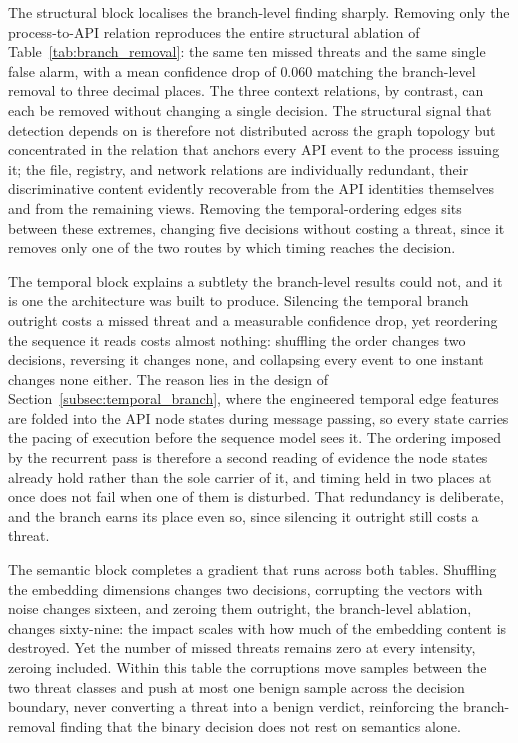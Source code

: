 \documentclass[%
    BCOR=10mm,
    DIV=13,
    toc=bibliography,
    toc=listof,
    oneside,
    12pt,
]{scrbook}
\begin{document}
The structural block localises the branch-level finding sharply. Removing
only the process-to-API relation reproduces the entire structural ablation of
Table~\ref{tab:branch_removal}: the same ten missed threats and the same
single false alarm, with a mean confidence drop of $0.060$ matching the
branch-level removal to three decimal places. The
three context relations, by contrast, can each be removed without changing a
single decision. The structural signal that detection depends on is therefore
not distributed across the graph topology but concentrated in the relation
that anchors every API event to the process issuing it; the file, registry,
and network relations are individually redundant, their discriminative
content evidently recoverable from the API identities themselves and from the
remaining views. Removing the temporal-ordering edges sits between these
extremes, changing five decisions without costing a threat, since it removes
only one of the two routes by which timing reaches the decision.

The temporal block explains a subtlety the branch-level results could not, and
it is one the architecture was built to produce. Silencing the temporal branch
outright costs a missed threat and a measurable confidence drop, yet reordering
the sequence it reads costs almost nothing: shuffling the order changes two
decisions, reversing it changes none, and collapsing every event to one
instant changes none either. The reason lies in the design of
Section~\ref{subsec:temporal_branch}, where the engineered temporal edge
features are folded into the API node states during message passing, so every
state carries the pacing of execution before the sequence model sees it. The
ordering imposed by the recurrent pass is therefore a second reading of
evidence the node states already hold rather than the sole carrier of it, and
timing held in two places at once does not fail when one of them is disturbed.
That redundancy is deliberate, and the branch earns its place even so, since
silencing it outright still costs a threat.

The semantic block completes a gradient that runs across both tables.
Shuffling the embedding dimensions changes two decisions, corrupting the
vectors with noise changes sixteen, and zeroing them outright, the
branch-level ablation, changes sixty-nine: the impact scales with how much of
the embedding content is destroyed. Yet the number of missed threats
remains zero at every intensity, zeroing included. Within this table the
corruptions move samples between the two threat classes and push at most one
benign sample across the decision boundary, never converting a threat into a
benign verdict, reinforcing the branch-removal finding that the binary
decision does not rest on semantics alone.
\end{document}

